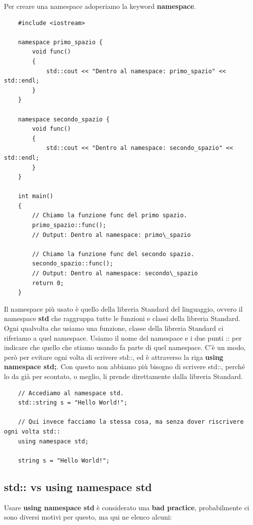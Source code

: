 \textsf{\small Per creare una namespace adoperiamo la keyword \textbf{namespace}.} \\

\begin{lstlisting}
	#include <iostream>
	
	namespace primo_spazio {
		void func()
		{
			std::cout << "Dentro al namespace: primo_spazio" << std::endl;
		}
	}

	namespace secondo_spazio {
		void func()
		{
			std::cout << "Dentro al namespace: secondo_spazio" << std::endl;
		}
	}

	int main()
	{
		// Chiamo la funzione func del primo spazio.
		primo_spazio::func();
		// Output: Dentro al namespace: primo\_spazio
		
		// Chiamo la funzione func del secondo spazio.
		secondo_spazio::func();
		// Output: Dentro al namespace: secondo\_spazio
		return 0;
	}
\end{lstlisting}

\textsf{\small Il namespace più usato è quello della libreria Standard del linguaggio, ovvero il namespace \textbf{std} che raggruppa tutte le funzioni e classi della libreria Standard. } \\

\textsf{\small Ogni qualvolta che usiamo una funzione, classe della libreria Standard ci riferiamo a quel namespace. Usiamo il nome del namespace e i due punti :: per indicare che quello che stiamo usando fa parte di quel namespace. C'è un modo, però per evitare ogni volta di scrivere std::, ed è attraverso la riga \textbf{using namespace std;}. Con questo non abbiamo più bisogno di scrivere std::, perché lo da già per scontato, o meglio, li prende direttamente dalla libreria Standard.} \\

\begin{lstlisting}
	// Accediamo al namespace std.
	std::string s = "Hello World!";
	
	// Qui invece facciamo la stessa cosa, ma senza dover riscrivere ogni volta std::
	using namespace std;
	
	string s = "Hello World!";
\end{lstlisting}


\subsection{std:: vs using namespace std}

\textsf{\small Usare \textbf{using namespace std} è considerato una \textbf{\color{red}bad practice}, probabilmente ci sono diversi motivi per questo, ma qui ne elenco alcuni: } \\

